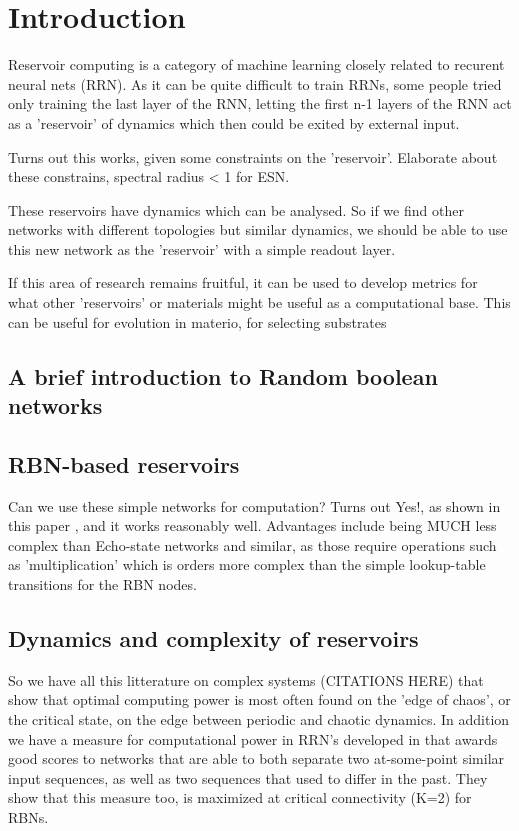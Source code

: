 \section{Introduction}

Reservoir computing is a category of machine learning closely related to recurent neural nets (RRN).
As it can be quite difficult to train RRNs, some people \cite{liquidstatepaper} \cite{echostatenetworkpaper} tried only training the last layer of the RNN,
letting the first n-1 layers of the RNN act as a 'reservoir' of dynamics which then could be exited by external input.

Turns out this works, given some constraints on the 'reservoir'.
Elaborate about these constrains, spectral radius < 1 for ESN.

These reservoirs have dynamics which can be analysed.
So if we find other networks with different topologies but similar dynamics,
we should be able to use this new network as the 'reservoir' with a simple readout layer.

If this area of research remains fruitful, it can be used to develop metrics for what other 'reservoirs' or materials might be useful as a  computational base.
This can be useful for evolution in materio, for selecting substrates \cite{evolutionInMaterio}


\subsection{A brief introduction to Random boolean networks}

\subsection{RBN-based reservoirs}

Can we use these simple networks for computation?
Turns out Yes!, as shown in this paper \cite{rbn-reservoir}, and it works reasonably well.
Advantages include being MUCH less complex than Echo-state networks and similar, as those require operations such as 'multiplication' which is orders more complex than the simple lookup-table transitions for the RBN nodes.

\subsection{Dynamics and complexity of reservoirs}

So we have all this litterature on complex systems (CITATIONS HERE) that show that optimal computing power is most often found on the 'edge of chaos', or the critical state, on the edge between periodic and chaotic dynamics.
In addition we have a measure for computational power in RRN's developed in \cite{rbn-reservoir} that awards good scores to networks that are able to both separate two at-some-point similar input sequences, as well as two sequences that used to differ in the past.
They show that this measure too, is maximized at critical connectivity (K=2) for RBNs.

